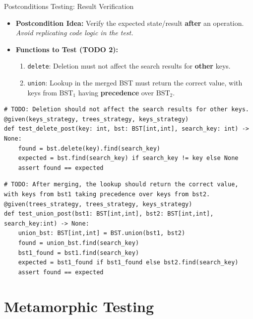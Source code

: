 \documentclass{beamer}
\begin{document}
\begin{frame}{Postconditions Testing: Result Verification}
    \begin{itemize}
        \item \textbf{Postcondition Idea:} Verify the expected state/result \textbf{after} an operation. \emph{Avoid replicating code logic in the test.}
        \item \textbf{Functions to Test (TODO 2):}
        \begin{enumerate}
            \item \texttt{delete}: Deletion must not affect the search results for \textbf{other} keys.
            \item \texttt{union}: Lookup in the merged BST must return the correct value, with keys from $\text{BST}_1$ having \textbf{precedence} over $\text{BST}_2$.
        \end{enumerate}
    \end{itemize}

        \framebreak

    \begin{lstlisting}
# TODO: Deletion should not affect the search results for other keys.
@given(keys_strategy, trees_strategy, keys_strategy)
def test_delete_post(key: int, bst: BST[int,int], search_key: int) -> None:
    found = bst.delete(key).find(search_key)
    expected = bst.find(search_key) if search_key != key else None
    assert found == expected
    \end{lstlisting}

    \framebreak

    \begin{lstlisting}
# TODO: After merging, the lookup should return the correct value, with keys from bst1 taking precedence over keys from bst2.
@given(trees_strategy, trees_strategy, keys_strategy)
def test_union_post(bst1: BST[int,int], bst2: BST[int,int], search_key:int) -> None:
    union_bst: BST[int,int] = BST.union(bst1, bst2)
    found = union_bst.find(search_key)
    bst1_found = bst1.find(search_key)
    expected = bst1_found if bst1_found else bst2.find(search_key)
    assert found == expected
    \end{lstlisting}
\end{frame}

\section{Metamorphic Testing}
\end{document}
